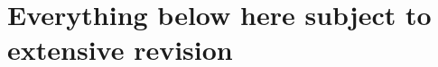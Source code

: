 \documentclass{article}
\begin{document}
\begin{table}[ht]
\begin{tabular}{l l l l r}
    \bottomrule
  \end{tabular}
\end{table}




\newpage
\vspace{20mm}

\section{Everything below here subject to extensive revision}

\vspace{20mm}
\end{document}
